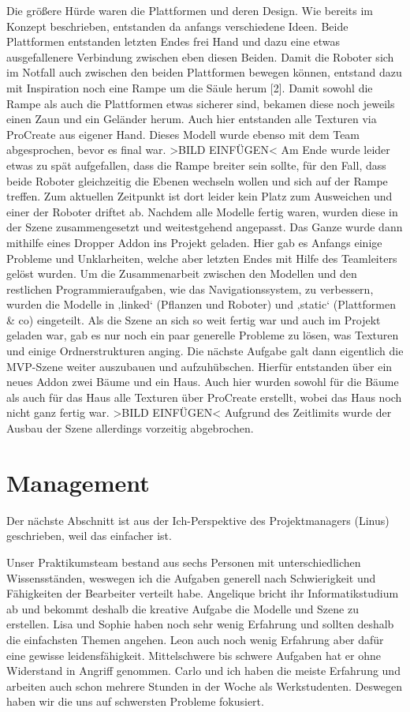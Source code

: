 Die größere Hürde waren die Plattformen und deren Design. Wie bereits im Konzept beschrieben, entstanden da anfangs verschiedene Ideen. Beide Plattformen entstanden letzten Endes frei Hand und dazu eine etwas ausgefallenere Verbindung zwischen eben diesen Beiden. Damit die Roboter sich im Notfall auch zwischen den beiden Plattformen bewegen können, entstand dazu mit Inspiration noch eine Rampe um die Säule herum [2]. Damit sowohl die Rampe als auch die Plattformen etwas sicherer sind, bekamen diese noch jeweils einen Zaun und ein Geländer herum. Auch hier entstanden alle Texturen via ProCreate aus eigener Hand. Dieses Modell wurde ebenso mit dem Team abgesprochen, bevor es final war. >BILD EINFÜGEN< Am Ende wurde leider etwas zu spät aufgefallen, dass die Rampe breiter sein sollte, für den Fall, dass beide Roboter gleichzeitig die Ebenen wechseln wollen und sich auf der Rampe treffen. Zum aktuellen Zeitpunkt ist dort leider kein Platz zum Ausweichen und einer der Roboter driftet ab.
Nachdem alle Modelle fertig waren, wurden diese in der Szene zusammengesetzt und weitestgehend angepasst. Das Ganze wurde dann mithilfe eines Dropper Addon ins Projekt geladen. Hier gab es Anfangs einige Probleme und Unklarheiten, welche aber letzten Endes mit Hilfe des Teamleiters gelöst wurden. Um die Zusammenarbeit zwischen den Modellen und den restlichen Programmieraufgaben, wie das Navigationssystem, zu verbessern, wurden die Modelle in ‚linked‘ (Pflanzen und Roboter) und ‚static‘ (Plattformen & co) eingeteilt.
Als die Szene an sich so weit fertig war und auch im Projekt geladen war, gab es nur noch ein paar generelle Probleme zu lösen, was Texturen und einige Ordnerstrukturen anging.
Die nächste Aufgabe galt dann eigentlich die MVP-Szene weiter auszubauen und aufzuhübschen. Hierfür entstanden über ein neues Addon zwei Bäume und ein Haus. Auch hier wurden sowohl für die Bäume als auch für das Haus alle Texturen über ProCreate erstellt, wobei das Haus noch nicht ganz fertig war. >BILD EINFÜGEN< Aufgrund des Zeitlimits wurde der Ausbau der Szene allerdings vorzeitig abgebrochen.

\section{Management}

Der nächste Abschnitt ist aus der Ich-Perspektive des Projektmanagers (Linus) geschrieben, weil das einfacher ist.

Unser Praktikumsteam bestand aus sechs Personen mit unterschiedlichen Wissensständen, weswegen ich die Aufgaben generell nach Schwierigkeit und Fähigkeiten der Bearbeiter verteilt habe. Angelique bricht ihr Informatikstudium ab und bekommt deshalb die kreative Aufgabe die Modelle und Szene zu erstellen. Lisa und Sophie haben noch sehr wenig Erfahrung und sollten deshalb die einfachsten Themen angehen. Leon auch noch wenig Erfahrung aber dafür eine gewisse leidensfähigkeit. Mittelschwere bis schwere Aufgaben hat er ohne Widerstand in Angriff genommen. Carlo und ich haben die meiste Erfahrung und arbeiten auch schon mehrere Stunden in der Woche als Werkstudenten. Deswegen haben wir die uns auf schwersten Probleme fokusiert.

